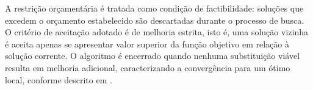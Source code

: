 A restrição orçamentária é tratada como condição de factibilidade: soluções que excedem o orçamento estabelecido são descartadas durante o processo de busca. 
O critério de aceitação adotado é de melhoria estrita, isto é, uma solução vizinha é aceita apenas se apresentar valor superior da função objetivo em relação 
à solução corrente. O algoritmo é encerrado quando nenhuma substituição viável resulta em melhoria adicional, caracterizando a convergência para um ótimo local, 
conforme descrito em \cite{Gendreau2010}.

